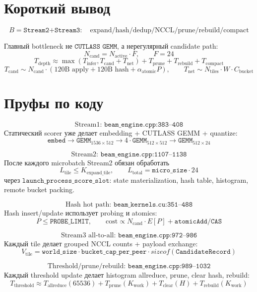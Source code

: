 \documentclass[11pt]{article}
\begin{document}
\section*{Короткий вывод}

\[
B=\texttt{Stream2+Stream3}:
\quad
\text{expand/hash/dedup/NCCL/prune/rebuild/compact}
\]

Главный bottleneck не \(\texttt{CUTLASS GEMM}\), а нерегулярный candidate path:
\[
N_{\text{cand}}=N_{\text{active}}\cdot F,\qquad F=24
\]
\[
T_{\text{depth}}\approx
\max(T_{\text{infer}},T_{\text{cand}}+T_{\text{net}})+T_{\text{prune}}+T_{\text{rebuild}}+T_{\text{compact}}
\]
\[
T_{\text{cand}}\sim N_{\text{cand}}\cdot(120\text{B apply}+120\text{B hash}+\alpha_{\text{atomic}}P),
\qquad
T_{\text{net}}\sim N_{\text{tiles}}\cdot W\cdot C_{\text{bucket}}
\]

\section*{Пруфы по коду}

\[
\text{Stream1: }\texttt{beam\_engine.cpp:383--408}
\]
Статический scorer уже делает embedding + CUTLASS GEMM + quantize:
\[
\texttt{embed}\rightarrow
\texttt{GEMM}_{1536\times512}\rightarrow
4\cdot\texttt{GEMM}_{512\times512}\rightarrow
\texttt{GEMM}_{512\times24}
\]

\[
\text{Stream2: }\texttt{beam\_engine.cpp:1107--1138}
\]
После каждого microbatch Stream2 обязан обработать
\[
L_{\text{tile}}\le K_{\text{expand\_tile}},\qquad
L_{\text{total}}=\texttt{micro\_size}\cdot24
\]
через \(\texttt{launch\_process\_score\_slot}\): state materialization, hash table, histogram, remote bucket packing.

\[
\text{Hash hot path: }\texttt{beam\_kernels.cu:351--488}
\]
Hash insert/update использует probing и atomics:
\[
P\le\texttt{PROBE\_LIMIT},\qquad
\text{cost}\propto N_{\text{cand}}\cdot E[P]+\texttt{atomicAdd/CAS}
\]

\[
\text{Stream3 all-to-all: }\texttt{beam\_engine.cpp:972--986}
\]
Каждый tile делает grouped NCCL counts + payload exchange:
\[
V_{\text{tile}}=\texttt{world\_size}\cdot\texttt{bucket\_cap\_per\_peer}\cdot sizeof(\texttt{CandidateRecord})
\]

\[
\text{Threshold/prune/rebuild: }\texttt{beam\_engine.cpp:989--1032}
\]
Каждый threshold update делает histogram allreduce, prune, clear hash, rebuild:
\[
T_{\text{threshold}}\approx T_{\text{allreduce}}(65536)+T_{\text{prune}}(K_{\text{work}})+T_{\text{clear}}(H)+T_{\text{rebuild}}(K_{\text{work}})
\]
\end{document}
